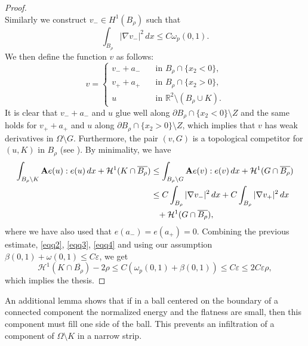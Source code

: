 \documentclass[12pt]{article}
\theoremstyle{definition}
\theoremstyle{remark}
\numberwithin{equation}{section}
\newcommand{\dd}{\partial}
\newcommand{\R}{\mathbb{R}}
\newcommand{\D}{\nabla}
\newcommand{\A}{\mathbf{A}}
\renewcommand{\H}{\mathcal{H}}
\begin{document}
\begin{proof}
\begin{equation}
    \end{equation}
    Similarly we construct $v_-\in H^1(B_\rho)$ such that 
    \begin{equation}
        \label{eqq4}
        \int_{B_\rho}|\D v_-|^2\,dx\leq C\omega_p(0,1).
    \end{equation}
    We then define the function $v$ as follows:
    \begin{equation}
        v=
        \begin{cases}
            v_- + a_-\quad&\text{in }B_\rho\cap  {\{x_2<0\}},\\
            v_+ + a_+ &\text{in }B_\rho\cap  {\{x_2>0\}},\\
            u & \text{in }\R^2\setminus (B_\rho\cup K).
        \end{cases}
    \end{equation}
    It is clear that $v_-+a_-$ and $u$ glue well along ${\dd B_\rho\cap\{x_2<0\}\setminus Z}$ and the same holds for $v_++a_+$ and $u$
    along ${\dd B_\rho\cap\{x_2>0\}\setminus Z}$, which implies that $v$ has weak derivatives in $\Omega \setminus G$. Furthermore,
    the pair $(v,G)$ is a topological competitor for $(u,K)$ in $B_\rho$ (see \cite[Proposition 45.1]{d}). By
    minimality, we have
    \begin{align*}
        \int_{B_\rho\setminus K} \A e(u):e(u) \,dx+\H^1(K\cap\overline{B_\rho})
& \leq \int_{B_\rho\setminus G} \A e(v):e(v) \,dx+\H^1(G\cap\overline{B_\rho})\\
& \leq C \int_{B_\rho}|\D v_-|^2\,dx+ C\int_{B_\rho}|\D v_+|^2\,dx\\
&\hphantom{\leq} + \H^1(G\cap\overline{B_\rho}),
    \end{align*}
    where we have also used that $e(a_-)=e(a_+)=0$. Combining the previous estimate, \eqref{eqq2}, \eqref{eqq3},
    \eqref{eqq4} and using our assumption $\beta(0,1) + \omega(0,1) \leq C \varepsilon$, we get
    \begin{equation}
        \H^1(K\cap\overline{B_\rho})-2\rho
        \leq C(\omega_p(0,1)+\beta(0,1))\leq C\varepsilon \leq 2 C \varepsilon \rho,
    \end{equation}
    which implies the thesis.
\end{proof}

An additional lemma shows that if in a ball centered on the boundary of a connected component the normalized
energy and the flatness are small, then this component must fill one side of the ball.  This prevents an
infiltration of a component of $\Omega \setminus K$ in a narrow strip.
\end{document}
